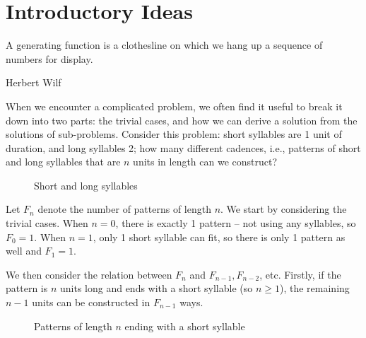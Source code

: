 \documentclass[a4paper, 12pt]{report}
\begin{document}

\tableofcontents

\chapter{Introductory Ideas}\label{ch:intro}
\epigraph{A generating function is a clothesline on which we hang up a sequence of numbers for display.}{Herbert Wilf \autocite*[1]{wilf}}

When we encounter a complicated problem, we often find it useful to break it down into two parts: the trivial cases, and how we can derive a solution from the solutions of sub-problems. Consider this problem: short syllables are 1 unit of duration, and long syllables 2; how many different cadences, i.e., patterns of short and long syllables that are $n$ units in length can we construct?

\begin{figure}[h]
    \centering
    \caption{Short and long syllables}
    \label{fig:short_long}
\end{figure}

Let $F_n$ denote the number of patterns of length $n$. We start by considering the trivial cases. When $n = 0$, there is exactly 1 pattern -- not using any syllables, so $F_0 = 1$. When $n = 1$, only 1 short syllable can fit, so there is only 1 pattern as well and $F_1 = 1$.

We then consider the relation between $F_n$ and $F_{n - 1}, F_{n - 2}$, etc. Firstly, if the pattern is $n$ units long and ends with a short syllable (so $n \geq 1$), the remaining $n - 1$ units can be constructed in $F_{n - 1}$ ways.

\begin{figure}[h]
    \centering
    \caption{Patterns of length $n$ ending with a short syllable}
    \label{fig:end_with_short}
\end{figure}
\end{document}
